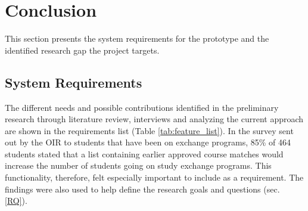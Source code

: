 \section{Conclusion}
This section presents the system requirements for the prototype and the identified research gap the project targets.

\subsection{System Requirements}\label{sec:requirements}

The different needs and possible contributions identified in the preliminary research through literature review, interviews and analyzing the current approach are shown in the requirements list (Table \ref{tab:feature_list}). In the survey \cite{intersek_report} sent out by the OIR to students that have been on exchange programs, 85\% of 464 students stated that a list containing earlier approved course matches would increase the number of students going on study exchange programs. This functionality, therefore, felt especially important to include as a requirement. The findings were also used to help define the research goals and questions (sec. \ref{RQ}). 

